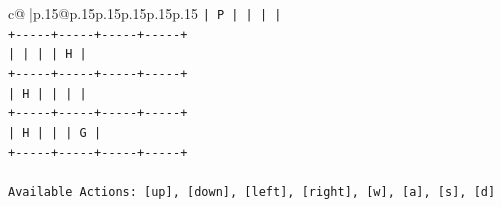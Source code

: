 \documentclass{article}
\begin{document}
{\begin{supertabular}{c@{$\;$}|p{.15\linewidth}@{}p{.15\linewidth}p{.15\linewidth}p{.15\linewidth}p{.15\linewidth}p{.15\linewidth}}
{{{\texttt{|  P  |     |     |     |} \\
\texttt{+{-}{-}{-}{-}{-}+{-}{-}{-}{-}{-}+{-}{-}{-}{-}{-}+{-}{-}{-}{-}{-}+} \\
\texttt{|     |     |     |  H  |} \\
\texttt{+{-}{-}{-}{-}{-}+{-}{-}{-}{-}{-}+{-}{-}{-}{-}{-}+{-}{-}{-}{-}{-}+} \\
\texttt{|  H  |     |     |     |} \\
\texttt{+{-}{-}{-}{-}{-}+{-}{-}{-}{-}{-}+{-}{-}{-}{-}{-}+{-}{-}{-}{-}{-}+} \\
\texttt{|  H  |     |     |  G  |} \\
\texttt{+{-}{-}{-}{-}{-}+{-}{-}{-}{-}{-}+{-}{-}{-}{-}{-}+{-}{-}{-}{-}{-}+} \\
\\ 
\texttt{Available Actions: {[}up{]}, {[}down{]}, {[}left{]}, {[}right{]}, {[}w{]}, {[}a{]}, {[}s{]}, {[}d{]}} \\
            }
        }
    }
     \\ \\


\end{supertabular}}
\end{document}
